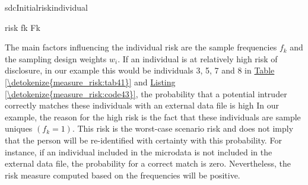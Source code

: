 \documentclass[letterpaper,10pt,english]{sphinxmanual}
\begin{document}
\def\sphinxLiteralBlockLabel{\label{\detokenize{measure_risk:code43}}}
%
\begin{sphinxVerbatim}[commandchars=\\\{\},numbers=left,firstnumber=1,stepnumber=1]
     sdcInitialriskindividual

              risk           fk    Fk
     \PYG{p}{[}\PYG{p}{]}              
     \PYG{p}{[}\PYG{p}{]}              
     \PYG{p}{[}\PYG{p}{]}              
     \PYG{p}{[}\PYG{p}{]}              
     \PYG{p}{[}\PYG{p}{]}              
     \PYG{p}{[}\PYG{p}{]}              
     \PYG{p}{[}\PYG{p}{]}              
     \PYG{p}{[}\PYG{p}{]}              
     \PYG{p}{[}\PYG{p}{]}              
     \PYG{p}{[}\PYG{p}{]}             
\end{sphinxVerbatim}

The main factors influencing the individual risk are the sample
frequencies \(f_{k}\) and the sampling design weights \(w_{i}\).
If an individual is at relatively high risk of disclosure, in our
example this would be individuals 3, 5, 7 and 8 in \hyperref[\detokenize{measure_risk:tab41}]{Table \ref{\detokenize{measure_risk:tab41}}} and
\hyperref[\detokenize{measure_risk:code43}]{Listing \ref{\detokenize{measure_risk:code43}}}, the probability that a potential intruder correctly matches these
individuals with an external data file is high  In our example, the reason for the
high risk is the fact that these individuals are sample uniques
\((f_{k} = 1)\). This risk is the worst-case scenario risk and does
not imply that the person will be re-identified with certainty with this
probability. For instance, if an individual included in the microdata is
not included in the external data file, the probability for a correct
match is zero. Nevertheless, the risk measure computed based on the
frequencies will be positive.
\end{document}
